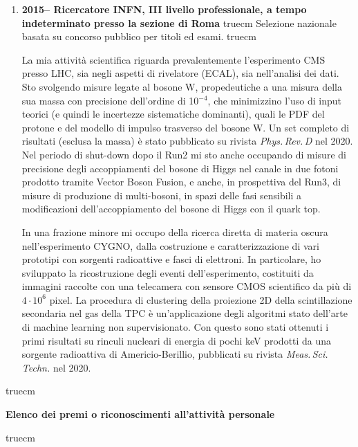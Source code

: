 \documentclass[11pt,twoside,a4paper]{article}
\begin{document}
\begin{enumerate}
Ho svolto l'analisi dei dati per la ricerca di materia oscura nei
canali \textit{monojet}, con un jet e energia trasversa mancante
nell'evento, utilizzando i dati del 2016, fino al limite sistematico
della ricerca.

 truecm
\item \textbf{2015-- Ricercatore INFN, III livello professionale, a
  tempo indeterminato presso la sezione di Roma}
 truecm
Selezione nazionale basata su concorso pubblico per titoli ed esami.
 truecm

La mia attivit\`a scientifica riguarda prevalentemente l'esperimento
CMS presso LHC, sia negli aspetti di rivelatore (ECAL), sia
nell'analisi dei dati. Sto svolgendo misure legate al bosone W,
propedeutiche a una misura della sua massa con precisione dell'ordine
di 10$^{-4}$, che minimizzino l'uso di input teorici (e quindi le
incertezze sistematiche dominanti), quali le PDF del protone e del
modello di impulso trasverso del bosone W. Un set completo di
risultati (esclusa la massa) \`e stato pubblicato su rivista \textit{Phys.\,Rev.\,D} nel
2020. Nel periodo di shut-down dopo il Run2 mi sto anche occupando di
misure di precisione degli accoppiamenti del bosone di Higgs nel
canale in due fotoni prodotto tramite Vector Boson Fusion, e anche, in
prospettiva del Run3, di misure di produzione di multi-bosoni, in
spazi delle fasi sensibili a modificazioni dell'accoppiamento del
bosone di Higgs con il quark top.

In una frazione minore mi occupo della ricerca diretta di materia
oscura nell'esperimento CYGNO, dalla costruzione e caratterizzazione
di vari prototipi con sorgenti radioattive e fasci di elettroni. In
particolare, ho sviluppato la ricostruzione degli eventi
dell'esperimento, costituiti da immagini raccolte con una telecamera
con sensore CMOS scientifico da pi\`u di $4\cdot10^6$ pixel.  La
procedura di clustering della proiezione 2D della scintillazione
secondaria nel gas della TPC \`e un'applicazione degli algoritmi stato
dell'arte di machine learning non supervisionato. Con questo sono
stati ottenuti i primi risultati su rinculi nucleari di energia di
pochi keV prodotti da una sorgente radioattiva di Americio-Berillio,
pubblicati su rivista \textit{Meas.\,Sci.\,Techn.} nel 2020.

\end{enumerate}


 truecm
\begin{center}
\textbf{Elenco dei premi o riconoscimenti all’attivit\`a personale}
\end{center}
 truecm
\end{document}
